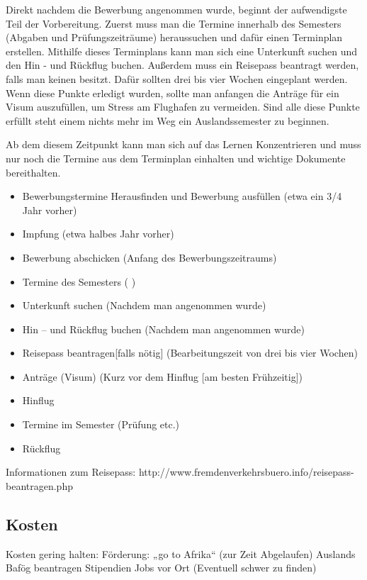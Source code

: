 \documentclass[11pt]{article}
\begin{document}
Direkt nachdem die Bewerbung angenommen wurde, beginnt der aufwendigste Teil der Vorbereitung. Zuerst muss man die Termine innerhalb des Semesters (Abgaben und Prüfungszeiträume) heraussuchen und dafür einen Terminplan erstellen.
Mithilfe dieses Terminplans kann man sich eine Unterkunft suchen und den Hin - und Rückflug buchen.  Außerdem muss ein Reisepass beantragt werden, falls man keinen besitzt. Dafür sollten drei bis vier Wochen eingeplant werden. Wenn diese Punkte erledigt wurden, sollte man anfangen die Anträge für ein Visum auszufüllen, um Stress am Flughafen zu vermeiden. Sind alle diese Punkte erfüllt steht einem nichts mehr im Weg ein Auslandssemester zu beginnen.

Ab dem diesem Zeitpunkt kann man sich auf das Lernen Konzentrieren und muss nur noch die Termine aus dem Terminplan einhalten und wichtige Dokumente bereithalten.

\begin{itemize}
\item Bewerbungstermine Herausfinden und Bewerbung ausfüllen (etwa ein 3/4 Jahr vorher)
\item Impfung					                           (etwa halbes Jahr vorher)
\item Bewerbung abschicken			(Anfang des Bewerbungszeitraums)
\item Termine des Semesters                                  ( )
\item Unterkunft suchen				(Nachdem man angenommen wurde)
\item Hin – und Rückflug buchen                           (Nachdem man angenommen wurde)
\item Reisepass beantragen[falls nötig]		(Bearbeitungszeit von drei bis vier Wochen)
\item Anträge (Visum)				(Kurz vor dem Hinflug [am besten Frühzeitig])
\item Hinflug
\item Termine im Semester (Prüfung etc.)
\item Rückflug

\end{itemize}
Informationen zum Reisepass:
http://www.fremdenverkehrsbuero.info/reisepass-beantragen.php

\newpage

\subsection{Kosten}
Kosten gering halten:
Förderung: „go to Afrika“ (zur Zeit Abgelaufen)
Auslands Bafög beantragen
Stipendien
Jobs vor Ort (Eventuell schwer zu finden)\\
\end{document}
